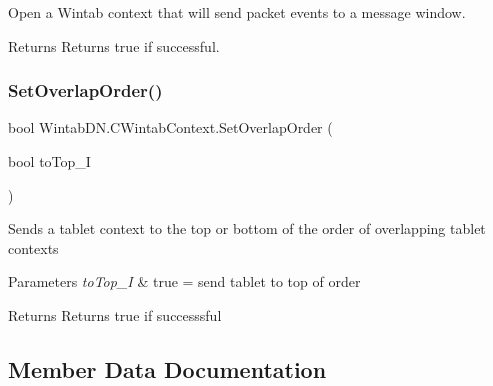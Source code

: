 Open a Wintab context that will send packet events to a message window. 

\begin{DoxyReturn}{Returns}
Returns true if successful.
\end{DoxyReturn}
\mbox{\label{class_wintab_d_n_1_1_c_wintab_context_a26240e1cdf96ad7859a8fae08a41e412}} 
\subsubsection{\texorpdfstring{Set\+Overlap\+Order()}{SetOverlapOrder()}}
{\footnotesize\ttfamily bool Wintab\+D\+N.\+C\+Wintab\+Context.\+Set\+Overlap\+Order (\begin{DoxyParamCaption}\item[{bool}]{to\+Top\+\_\+I }\end{DoxyParamCaption})\hspace{0.3cm}{\ttfamily [inline]}}



Sends a tablet context to the top or bottom of the order of overlapping tablet contexts 


\begin{DoxyParams}{Parameters}
{\em to\+Top\+\_\+I} & true = send tablet to top of order\\
\hline
\end{DoxyParams}
\begin{DoxyReturn}{Returns}
Returns true if successsful
\end{DoxyReturn}


\subsection{Member Data Documentation}
\mbox{\label{class_wintab_d_n_1_1_c_wintab_context_aff540bf7703bf6e96bae3d5bfc3eaaa7}} 
